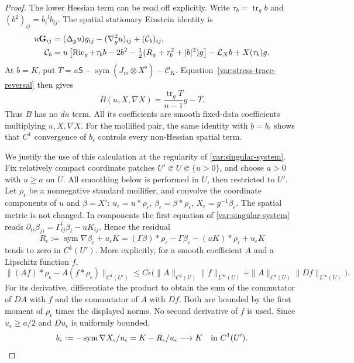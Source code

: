\begin{proof}
The lower Hessian term can be read off explicitly.  Write
$\tau_b=\operatorname{tr}_g b$ and $(b^2)_{ij}=b_i{}^l b_{lj}$.
The spatial stationary Einstein identity is
\begin{align}
 u\mathbf G_{ij}
   &=(\Delta_g u)g_{ij}-(\nabla_g^2u)_{ij}
                      +(\mathcal C_b)_{ij},
 \label{var:explicit-spatial-einstein}\\
 \mathcal C_b
   &=u\left[\operatorname{Ric}_g+\tau_b b-2b^2
       -\tfrac12(R_g+\tau_b^2+|b|^2)g\right]
       -\mathcal L_Xb+X(\tau_b)g.
 \notag
\end{align}
At $b=K$, put
$T=u\mathsf S-\operatorname{sym}(J_m\otimes X^\flat)
       -\mathcal C_K$.
Equation~\eqref{var:stress-trace-reversal} then gives
\begin{equation}
 B(u,X,\nabla X)=\frac{\operatorname{tr}_gT}{n-1}g-T.
 \label{var:explicit-lower-hessian}
\end{equation}
Thus $B$ has no $du$ term.  All its coefficients are smooth
fixed-data coefficients multiplying $u,X,\nabla X$.
For the mollified pair, the same identity with $b=b_\epsilon$
shows that $C^1$ convergence of $b_\epsilon$ controls every
non-Hessian spatial term.

We justify the use of this calculation at the regularity of
\eqref{var:singular-system}.  Fix relatively compact coordinate patches
$U'\Subset U\Subset\{u>0\}$, and choose $a>0$ with $u\geq a$ on $U$.
All smoothing below is performed in $U$, then restricted to $U'$.
Let $\rho_\epsilon$ be a nonnegative standard mollifier, and convolve
the coordinate components of $u$ and $\beta=X^\flat$:
$u_\epsilon=u*\rho_\epsilon$,
$\beta_\epsilon=\beta*\rho_\epsilon$,
$X_\epsilon=g^{-1}\beta_\epsilon$.
The spatial metric is not changed.  In components the first equation
of \eqref{var:singular-system} reads
$\partial_{(i}\beta_{j)}=\Gamma_{ij}^{l}\beta_l-uK_{ij}$.
Hence the residual
\begin{equation}\label{var:KID-mollifier-residual}
 R_\epsilon:=\operatorname{sym}\nabla\beta_\epsilon+u_\epsilon K
 = (\Gamma\beta)*\rho_\epsilon-\Gamma\beta_\epsilon
       -(uK)*\rho_\epsilon+u_\epsilon K
\end{equation}
tends to zero in $C^1(U')$.  More explicitly, for a smooth coefficient
$A$ and a Lipschitz function $f$,
\begin{equation}\label{var:C1-commutator}
 \|(Af)*\rho_\epsilon-A(f*\rho_\epsilon)\|_{C^1(U')}
 \leq C\epsilon\bigl(
       \|A\|_{C^2(U)}\|f\|_{L^\infty(U)}
       +\|A\|_{C^1(U)}\|Df\|_{L^\infty(U)}\bigr).
\end{equation}
For its derivative, differentiate the product to obtain the sum of
the commutator of $DA$ with $f$ and the commutator of $A$ with $Df$.
Both are bounded by the first moment of $\rho_\epsilon$ times the
displayed norms.  No second derivative of $f$ is used.
Since $u_\epsilon\geq a/2$ and $Du_\epsilon$ is uniformly bounded,
\begin{equation}\label{var:b-mollifier-convergence}
 b_\epsilon:=-\operatorname{sym}\nabla X_\epsilon/u_\epsilon
       =K-R_\epsilon/u_\epsilon\longrightarrow K
       \quad\hbox{in }C^1(U').
\end{equation}


\end{proof}
